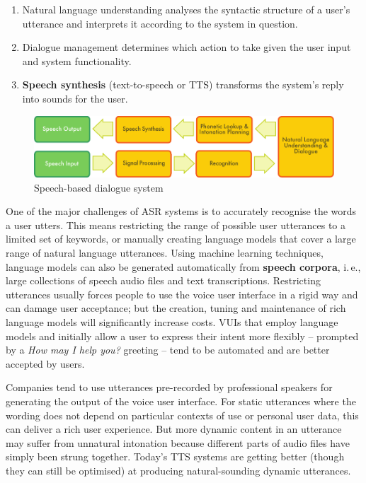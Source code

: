 \begin{multicols}{2}
\begin{enumerate}
\item Natural language understanding analyses the syntactic structure of a user’s
    utterance and interprets it according to the system in question.

\item Dialogue management determines which action to take given the user input
    and system functionality.

\item \textbf{Speech synthesis} (text-to-speech or TTS) transforms the system’s reply into
    sounds for the user.
\end{enumerate}

\begin{figure}[htb]
  \center
  \includegraphics[width=\textwidth]{../_media/english/simple_speech-based_dialogue_architecture}
  \caption{Speech-based dialogue system}
\label{fig:dialoguearch_en}
\end{figure}

One of the major challenges of ASR systems is to accurately recognise the words a user utters. This means restricting the range of possible user utterances to a limited set of keywords, or manually creating language models that cover a large range of natural language utterances. Using machine learning techniques, language models can also be generated automatically from \textbf{speech corpora}, i.\,e., large collections of speech audio files and text transcriptions. Restricting utterances usually forces people to use the voice user interface in a rigid way and can damage user acceptance; but the creation, tuning and maintenance of rich language models will significantly increase costs. VUIs that employ language models and initially allow a user to express their intent more flexibly -- prompted by a \textit{How may I help you?} greeting -- tend to be automated and are better accepted by users.

Companies tend to use utterances pre-recorded by professional speakers for generating the output of the voice user interface. For static utterances where the wording does not depend on particular contexts of use or personal user data, this can deliver a rich user experience. But more dynamic content in an utterance may suffer from unnatural intonation because different parts of audio files have simply been strung together. Today’s TTS systems are getting better (though they can still be optimised) at producing natural-sounding dynamic utterances.


\end{multicols}
